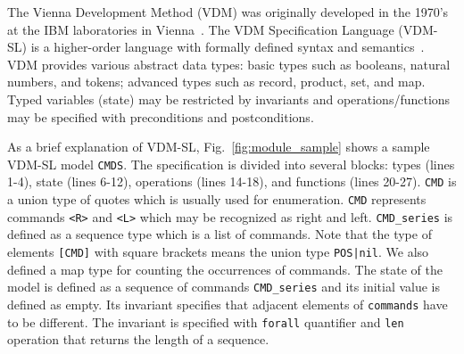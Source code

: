 
The Vienna Development Method (VDM) was originally developed in the 1970's at the IBM laboratories in Vienna~\cite{DBLP:conf/fm/1978}. The VDM Specification Language (VDM-SL) is a higher-order language with formally defined syntax and semantics~\cite{Prehn:1991:LNCS551,Larsen1995585}. VDM provides various abstract data types: basic types such as booleans, natural numbers, and tokens; advanced types such as record, product, set, and map. Typed variables (state) may be restricted by invariants and operations/functions may be specified with preconditions and postconditions.

As a brief explanation of VDM-SL, Fig.~\ref{fig:module_sample} shows a sample VDM-SL model {\tt CMDS}. The specification is divided into several blocks: types (lines 1-4), state (lines 6-12), operations (lines 14-18), and functions (lines 20-27). {\tt CMD} is a union type of quotes which is usually used for enumeration. {\tt CMD} represents commands {\tt <R>} and {\tt <L>} which may be recognized as right and left. {\tt CMD\_series} is defined as a sequence type which is a list of commands. Note that the type of elements {\tt [CMD]} with square brackets means the union type {\tt POS|nil}. We also defined a map type for counting the occurrences of commands. The state of the model is defined as a sequence of commands {\tt CMD\_series} and its initial value is defined as empty. Its invariant specifies that adjacent elements of {\tt commands} have to be different. The invariant is specified with {\tt forall} quantifier and {\tt len} operation that returns the length of a sequence.


